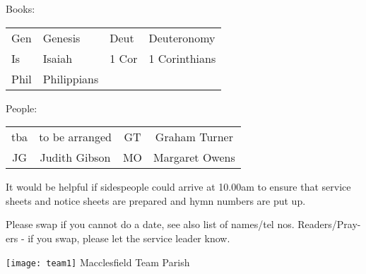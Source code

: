 \documentclass[10pt]{article}
\newif\ifpdf
\begin{document}
\begin{center}
\vspace{1em}
Books: \begin{tabular}{|l|l|l|l|} \hline
Gen & Genesis &
Deut & Deuteronomy \\
Is & Isaiah &
1 Cor & 1 Corinthians\\
Phil & Philippians &
 &  \\ \hline
\end{tabular}
People: \begin{tabular}{|c|c|c|c|}\hline
 tba & to be arranged & GT &  Graham Turner \\
 JG & Judith Gibson & MO & Margaret Owens \\
     \hline
  \end{tabular}
\end{center}
\begin{minipage}{0.7\textwidth}
\begin{changebar} 
It would be helpful if sidespeople 
could arrive at 10.00am to ensure that service sheets and notice sheets are 
prepared and hymn numbers are put up.
\end{changebar}

Please swap if you cannot do a date, see also list of names/tel nos.
Readers/Pray-ers - if you swap, please let the service leader know.
\end{minipage}
\begin{minipage}{0.3\textwidth}
\ifpdf
\fbox{
\texttt{[image: team1]} Macclesfield Team Parish
}
\else
\hspace{2em}
\texttt{[image: team1]} Macclesfield Team Parish
\fi
\end{minipage}
\end{document}
